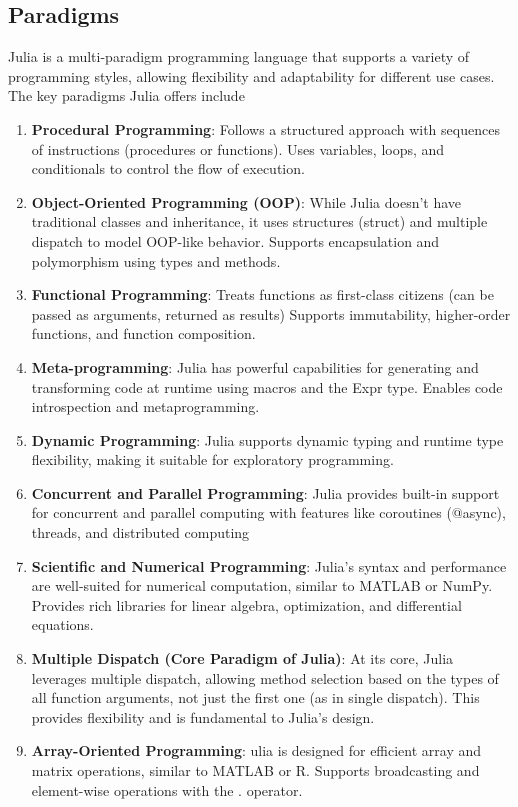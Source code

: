 \documentclass{report}
\begin{document}
    \subsection{Paradigms}
    \bigbreak \noindent 
    Julia is a multi-paradigm programming language that supports a variety of programming styles, allowing flexibility and adaptability for different use cases. The key paradigms Julia offers include
    \begin{enumerate}
        \item \textbf{Procedural Programming}: Follows a structured approach with sequences of instructions (procedures or functions).
            \bigbreak \noindent 
            Uses variables, loops, and conditionals to control the flow of execution.
        \item \textbf{Object-Oriented Programming (OOP)}: While Julia doesn't have traditional classes and inheritance, it uses structures (struct) and multiple dispatch to model OOP-like behavior.
            \bigbreak \noindent 
            Supports encapsulation and polymorphism using types and methods.
        \item \textbf{Functional Programming}: Treats functions as first-class citizens (can be passed as arguments, returned as results)
            \bigbreak \noindent 
            Supports immutability, higher-order functions, and function composition.
        \item \textbf{Meta-programming}: Julia has powerful capabilities for generating and transforming code at runtime using macros and the Expr type.
            \bigbreak \noindent 
            Enables code introspection and metaprogramming.
        \item \textbf{Dynamic Programming}: Julia supports dynamic typing and runtime type flexibility, making it suitable for exploratory programming.
        \item \textbf{ Concurrent and Parallel Programming}: Julia provides built-in support for concurrent and parallel computing with features like coroutines (@async), threads, and distributed computing
        \item \textbf{Scientific and Numerical Programming}: Julia's syntax and performance are well-suited for numerical computation, similar to MATLAB or NumPy.
            \bigbreak \noindent 
            Provides rich libraries for linear algebra, optimization, and differential equations.
        \item \textbf{Multiple Dispatch (Core Paradigm of Julia)}: At its core, Julia leverages multiple dispatch, allowing method selection based on the types of all function arguments, not just the first one (as in single dispatch).
            \bigbreak \noindent 
            This provides flexibility and is fundamental to Julia's design.
        \item \textbf{Array-Oriented Programming}: ulia is designed for efficient array and matrix operations, similar to MATLAB or R.
            \bigbreak \noindent 
            Supports broadcasting and element-wise operations with the . operator.
    \end{enumerate}
\end{document}
